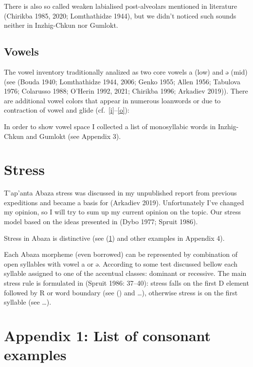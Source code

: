 \documentclass[
]{article}
\begin{document}
There is also so called weaken labialised post-alveolars mentioned in
literature (Chirikba 1985, 2020; Lomthathidze 1944), but we didn't
noticed such sounds neither in Inzhig-Chkun nor Gumlokt.

\hypertarget{vowels}{%
\subsection{Vowels}\label{vowels}}

The vowel inventory traditionally analized as two core vowels a (low)
and ə (mid) (see (Bouda 1940; Lomthathidze 1944, 2006; Genko 1955; Allen
1956; Tabulova 1976; Colarusso 1988; O'Herin 1992, 2021; Chirikba 1996;
Arkadiev 2019)). There are additional vowel colors that appear in
numerous loanwords or due to contraction of vowel and glide
(cf.~\ref{i}--\ref{o}):


In order to show vowel space I collected a list of monosyllabic words in
Inzhig-Chkun and Gumlokt (see Appendix 3).

\hypertarget{stress}{%
\section{Stress}\label{stress}}

T'ap'anta Abaza stress was discussed in my unpublished report from
previous expeditions and became a basis for (Arkadiev 2019).
Unfortunately I've changed my opinion, so I will try to sum up my
current opinion on the topic. Our stress model based on the ideas
presented in (Dybo 1977; Spruit 1986).

Stress in Abaza is distinctive (see (\ref{stress}) and other examples in
Appendix 4).


Each Abaza morpheme (even borrowed) can be represented by combination of
open syllables with vowel a or ə. According to some test discussed
bellow each syllable assigned to one of the accentual classes: dominant
or recessive. The main stress rule is formulated in (Spruit 1986:
37--40): stress falls on the first D element followed by R or word
boundary (see () and \ldots), otherwise stress is on the first syllable
(see \ldots).

\pagebreak

\hypertarget{appendix-1-list-of-consonant-examples}{%
\section*{Appendix 1: List of consonant
examples}\label{appendix-1-list-of-consonant-examples}}
\end{document}
